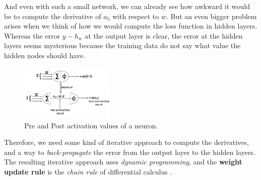 \documentclass{article}
\begin{document}
  And even with such a small network, we can already see how awkward it would be to compute the derivative of $a_5$ with respect to $w$. But an even bigger problem arises when we think of how we would compute the loss function in hidden layers. Whereas the error $y -h_w$ at the output layer is clear, the error at the hidden layers seems mysterious because the training data do not say what value the hidden nodes should have.
\begin{figure} %
    \centering
    \label{simpleNet}
    \includegraphics[width=0.4\textwidth]{pre-post-neuron}
    \caption{Pre and Post activation values of a neuron.}
\end{figure}

  Therefore, we need some kind of iterative approach to compute the derivatives, and a way to \textit{back-propagate} the error from the output layer to the hidden layers. The resulting iterative approach uses \textit{dynamic programming}, and the \textbf{weight update rule} is the \textit{chain rule} of differential calculus \citep{inbook:Aggarwal-3.2}.
\end{document}
